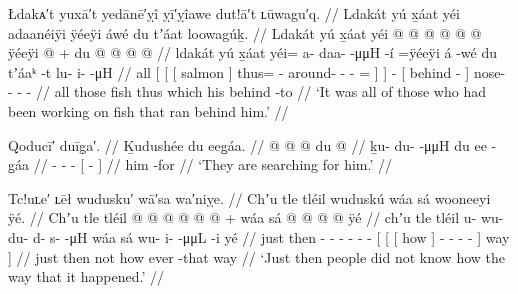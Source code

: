 \ex\label{ex:099-22-all-working-ran}%
%
\begingl
	\glpreamble	Łdakᴀ′t yuxā′t yedānē′ỵî ỵī′ỵîawe dut!ā′t ʟūwagu′q. //
	\glpreamble	Ldakát yú x̱áat yéi adaanéiÿi ÿéeÿi áwé du tʼáat loowagúḵ. //
	\gla	Ldakát {} yú {} {} x̱áat {}
			yéi @  @ {} @ {} @ {} @ {} @ \•ÿéeÿi {} {}
		 @ {} +
		{} du  @ {} {}
		 @ {} @ {} @ {} //
	\glb	ldakát {} yú {} {} x̱áat {}
			yéi= a- daa-  -μμH -í =ÿéeÿi {} {}
		á -wé
		{} du tʼáaᵏ -t {}
		lu- i-  -μH //
	\glc	all {}[  {}[ {}[ salmon {}]
			thus= - around-  - - = {}] {}]
		 -
		{}[  behind - {}]
		nose- - -  - //
	\gld	all {} those {} {} fish {} thus  {} {} {} which \• {} {}
		 {}
		{} his behind -to {}
		 {} {} {} //
	\glft	‘It was all of those who had been working on fish that ran behind him.’
		//
\endgl
\xe

\ex\label{ex:099-23-searching-for-him}%
%
\begingl
	\glpreamble	Qoducī′ duīg̣a′. //
	\glpreamble	Ḵudushée du eeg̱áa. //
	\gla	{} @ {} @ {} @ {}
		{} du  @ {} {} //
	\glb	ḵu- du-  -μμH
		{} du ee -g̱áa {} //
	\glc	{}- -  -
		{}[   - {}] //
	\gld	{} {} {} {}
		{} him {} -for {} //
	\glft	‘They are searching for him.’
		//
\endgl
\xe

\ex\label{ex:099-24-didnt-know-happened}%
%
\begingl
	\glpreamble	Tc!uʟe′ ʟēł wudusku′ wā′sa wa′niỵe. //
	\glpreamble	Chʼu tle tléil wuduskú wáa sá wooneeyi ÿé. //
	\gla	Chʼu tle tléil  @ {} @ {} @ {} @ {} @ {} @ {} +
		{} {} {} wáa sá {}
			 @ {} @ {} @ {} @ {} {} ÿé {} //
	\glb	chʼu tle tléil u- wu- du- d- s-  -μH
		{} {} {} wáa sá {}
			wu- i-  -μμL -i {} yé {} //
	\glc	just then  - - - - -  -
		{}[ {}[ {}[ how  {}]
			- -  - - {}] way {}] //
	\gld	just then not  {} {} {} {} {} {}
		{} {} {} how ever {}
			 {} {} {} -that {} way {} //
	\glft	‘Just then people did not know how the way that it happened.’
		//
\endgl
\xe

